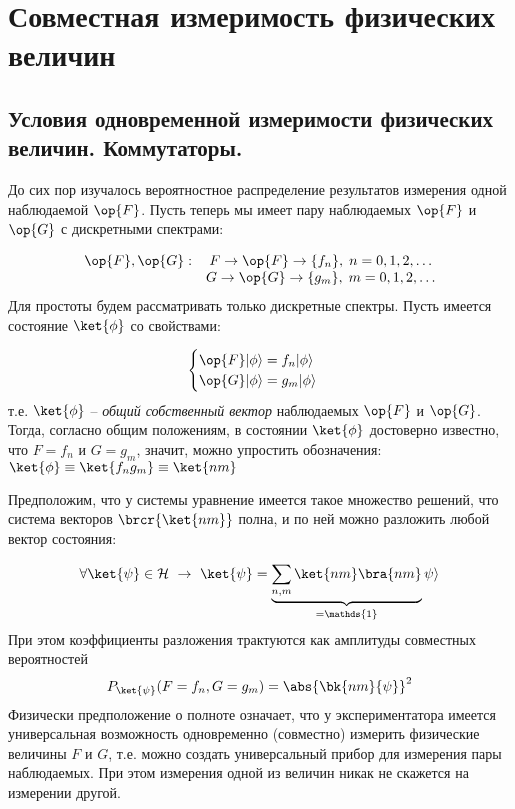 \chapter{Совместная измеримость физических величин}

\section{Условия одновременной измеримости физических величин. Коммутаторы.}

До сих пор изучалось вероятностное распределение результатов измерения одной наблюдаемой $\op{F}$. Пусть теперь мы имеет пару наблюдаемых $\op{F}$ и $\op{G}$ с дискретными спектрами:

$$
\begin{array}{lcl}
\op{F}, \op{G}:  & F \rightarrow \op{F} \rightarrow \{f_n\}, \; n=0,1,2,\dots\\
                 & G \rightarrow \op{G} \rightarrow \{g_m\}, \; m=0,1,2,\dots
\end{array}
$$%
%
Для простоты будем рассматривать только дискретные спектры. Пусть имеется состояние $\ket{\phi}$ со свойствами:

\begin{equation}
\label{eq:4_1_1}
  \begin{cases}
    \op{F} |\phi \rangle = f_n |\phi \rangle\\
    \op{G} |\phi \rangle = g_m |\phi \rangle
  \end{cases} 
\end{equation}%
%
т.е. $\ket{\phi}$ -- {\em общий собственный вектор} наблюдаемых $\op{F}$ и $\op{G}$. Тогда, согласно общим положениям, в состоянии $\ket{\phi}$ достоверно известно, что $F = f_n$ и $G=g_m$, значит, можно упростить обозначения: $\ket{\phi} \equiv \ket{f_n g_m} \equiv \ket{nm}$

Предположим, что у системы уравнение имеется такое множество решений, что система векторов $\brcr{\ket{nm}}$ полна, и по ней можно разложить любой вектор состояния:

\begin{equation}
  \label{eq:4_1_2}
  \forall \ket{\psi} \in \mathcal{H} ~\rightarrow ~ \ket{\psi} =
      \underbrace{\sum_{n,m}\ket{nm}\bra{nm}}_{=\mathds{1}} \psi \rangle 
\end{equation}%
%
При этом коэффициенты разложения трактуются как амплитуды совместных вероятностей
$$
  P_{\ket{\psi}}(F = f_n, G = g_m) = \abs{\bk{nm}{\psi}}^2
$$%
%
Физически предположение о полноте означает, что у экспериментатора имеется универсальная возможность одновременно (совместно) измерить физические величины $F$ и $G$, т.е. можно создать универсальный прибор для измерения пары наблюдаемых. При этом измерения одной из величин никак не скажется на измерении другой.

